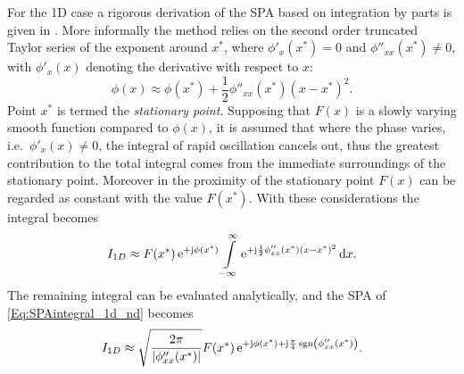 For the 1D case a rigorous derivation of the SPA based on integration by parts is given in \cite{Bleistein1984, Blenstein1975, Williams1999}.
More informally the method relies on the second order truncated Taylor series of the exponent around $x^*$, where $\phi'_x(x^*) = 0$ and $\phi''_{xx}(x^*) \neq 0$, with $\phi'_x(x)$ denoting the derivative with respect to $x$:
\begin{equation}
\phi(x) \approx \phi(x^*) + \frac{1}{2}\phi''_{xx}(x^*)(x-x^*)^2.
\end{equation}
Point $x^*$ is termed the \emph{stationary point}.
%
Supposing that $F(x)$ is a slowly varying smooth function compared to $\phi(x)$, it is assumed that where the phase varies, i.e.\ $\phi'_x(x) \neq 0$, the integral of rapid oscillation cancels out, thus the greatest contribution to the total integral comes from the immediate surroundings of the stationary point.
Moreover in the proximity of the stationary point $F(x)$ can be regarded as constant with the value $F(x^*)$.
%
With these considerations the integral becomes
\begin{align}
I_{1D} \approx F(x^*)\,\mathrm{e}^{+\mathrm{j}\phi(x^*)} 
\int\limits_{-\infty}^{\infty} \mathrm{e}^{+\mathrm{j} \frac{1}{2}\phi''_{xx}(x^*)(x-x^*)^2} \, \mathrm{d} x.
\end{align}
The remaining integral can be evaluated analytically, and the SPA of \eqref{Eq:SPAintegral_1d_nd} becomes \cite[Ch.\ 2.8]{Blenstein1975}
\begin{equation}
\label{Eq:SPAResult}
I_{1D} \approx \sqrt{\frac{2\pi}{| \phi''_{xx}(x^*) |}} F(x^*) \, \mathrm{e}^{+\mathrm{j} \phi(x^*) + \mathrm{j} \frac{\pi}{4}\,\mathrm{sgn}\left(  \phi''_{xx}(x^*) \right)}.
\end{equation}

